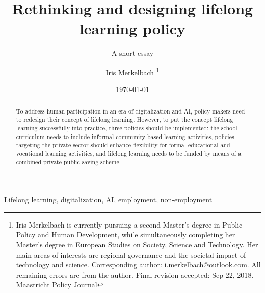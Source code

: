 \title{Rethinking and designing lifelong learning policy}
\subtitle{A short essay}
\author{Iris Merkelbach
\thanks{Iris Merkelbach is currently pursuing a second Master’s degree in Public Policy and Human Development, while simultaneously completing her Master’s degree in European Studies on Society, Science and Technology. Her main areas of interests are regional governance and the societal impact of technology and science. Corresponding author: \href{mailto:i.merkelbach@outlook.com}{i.merkelbach@outlook.com}. All remaining
	errors are from the author. Final revision accepted: Sep 22, 2018. \footnotesize{Maastricht Policy Journal\textsuperscript{\textcopyright}} }  
}
\date{\today}

\maketitle

\begin{abstract}
    To address human participation in an era of digitalization and AI, policy makers need to redesign their concept of lifelong learning. However, to put the concept lifelong learning successfully into practice, three policies should be implemented: the school curriculum needs to include informal community-based learning activities, policies targeting the private sector should enhance flexibility for formal educational and vocational learning activities, and lifelong learning needs to be funded by means of a combined private-public saving scheme.
\end{abstract}
\begin{keywords}
    Lifelong learning, digitalization, AI, employment, non-employment
\end{keywords}


